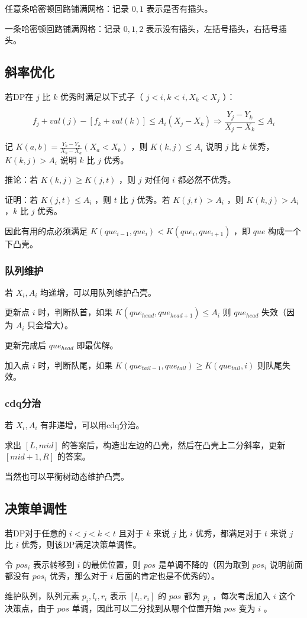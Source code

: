 任意条哈密顿回路铺满网格：记录 $0,1$ 表示是否有插头。

一条哈密顿回路铺满网格：记录 $0,1,2$ 表示没有插头，左括号插头，右括号插头。

\subsection{斜率优化}

若DP在 $j$ 比 $k$ 优秀时满足以下式子（ $j<i,k<i,X_k<X_j$ ）：

$$
f_j+val(j)-[f_k+val(k)]\le A_i(X_j-X_k) \Rightarrow
\frac{Y_j-Y_k}{X_j-X_k}\le A_i
$$

记 $K(a,b)=\frac{Y_b-Y_a}{X_b-X_a}(X_a<X_b)$ ，则 $K(k,j)\le A_i$ 说明 $j$ 比 $k$ 优秀，$K(k,j)>A_i$ 说明 $k$ 比 $j$ 优秀。

推论：若 $K(k,j)\ge K(j,t)$ ，则 $j$ 对任何 $i$ 都必然不优秀。

证明：若 $K(j,t)\le A_i$ ，则 $t$ 比 $j$ 优秀。若 $K(j,t)>A_i$ ，则 $K(k,j)>A_i$ ，$k$ 比 $j$ 优秀。

因此有用的点必须满足 $K(que_{i-1},que_i)<K(que_i,que_{i+1})$ ，即 $que$ 构成一个下凸壳。

\subsubsection{队列维护}

若 $X_i,A_i$ 均递增，可以用队列维护凸壳。

更新点 $i$ 时，判断队首，如果 $K(que_{head},que_{head+1})\le A_i$ 则 $que_{head}$ 失效（因为 $A_i$ 只会增大）。

更新完成后 $que_{head}$ 即最优解。

加入点 $i$ 时，判断队尾，如果 $K(que_{tail-1},que_{tail})\ge K(que_{tail},i)$ 则队尾失效。

\subsubsection{cdq分治}

若 $X_i,A_i$ 有非递增，可以用cdq分治。

求出 $[L,mid]$ 的答案后，构造出左边的凸壳，然后在凸壳上二分斜率，更新 $[mid+1,R]$ 的答案。

当然也可以平衡树动态维护凸壳。



\subsection{决策单调性}

若DP对于任意的 $i<j<k<t$ 且对于 $k$ 来说 $j$ 比 $i$ 优秀，都满足对于 $t$ 来说 $j$ 比 $i$ 优秀，则该DP满足决策单调性。

令 $pos_i$ 表示转移到 $i$ 的最优位置，则 $pos$ 是单调不降的（因为取到 $pos_i$ 说明前面都没有 $pos_i$ 优秀，那么对于 $i$ 后面的肯定也是不优秀的）。

维护队列，队列元素 $p_i,l_i,r_i$ 表示 $[l_i,r_i]$ 的 $pos$ 都为 $p_i$ ，每次考虑加入 $i$ 这个决策点，由于 $pos$ 单调，因此可以二分找到从哪个位置开始 $pos$ 变为 $i$ 。

